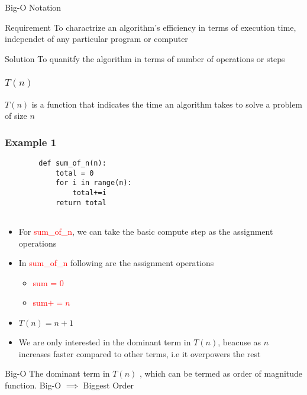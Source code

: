 \documentclass{beamer}
\begin{document}
\begin{frame}{Big-O Notation}
\begin{block}{Requirement}
    To charactrize an algorithm's efficiency in terms of execution time, independet of any particular program or computer
\end{block}
\begin{block}{Solution}
    To quanitfy the algorithm in terms of number of operations or steps 
\end{block}
\end{frame}

\begin{frame}
    \frametitle{$T(n)$}
    \begin{block}{}
        $T(n)$ is a function that indicates the time an algorithm takes to solve a problem of size $n$
    \end{block} 
\end{frame}

\begin{frame}[fragile]
\frametitle{Example 1}
    \begin{lstlisting}
        def sum_of_n(n):
            total = 0
            for i in range(n):
                total+=i
            return total
    
    \end{lstlisting}
\end{frame}

\begin{frame}
    \begin{itemize}
        \item For \textcolor{red}{sum\_of\_n}, we can take the basic compute step as the assignment operations
        \item In \textcolor{red}{sum\_of\_n} following are the assignment operations 
        \begin{itemize}
            \item \textcolor{red}{sum = 0}
            \item \textcolor{red}{sum$+=n$}
        \end{itemize}
        \item $T(n) = n+1 $
        \item We are only interested in the dominant term in $T(n)$, beacuse as $n$ increases faster compared to other terms, i.e it overpowers the rest
    \end{itemize}
    \begin{alertblock}{Big-O}
        The dominant term in $T(n)$ , which can be termed as \alert{order of magnitude} function. Big-O $\implies$ Biggest Order
        
    \end{alertblock}

\end{frame}
\end{document}
